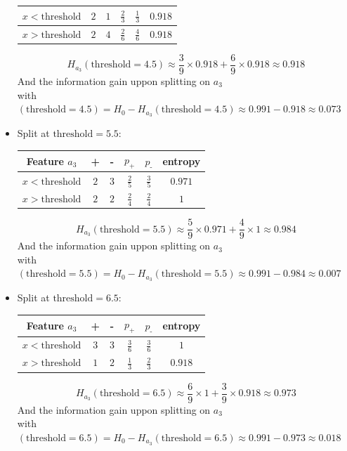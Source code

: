 \documentclass[a4paper, 10pt]{article}
\begin{document}
\begin{itemize}[label=$\square$]
\begin{center}
\begin{tabular}{ |c|c|c|c|c|c| }
            \hline
            $x<\text{threshold}$    & $2$    & $1$   & $\frac{2}{3}$ & $\frac{1}{3}$    & $0.918$\\
            \hline
            $x>\text{threshold}$    & $2$    & $4$   & $\frac{2}{6}$ & $\frac{4}{6} $   & $0.918$\\
            \hline
        \end{tabular}
    \end{center}
    $$
    H_{a_3}(\text{threshold}=4.5) \approx \frac{3}{9}\times0.918 + \frac{6}{9}\times0.918 \approx 0.918
    $$
    And the information gain uppon splitting on $a_3$ \\with $(\text{threshold}=4.5)= H_0 -H_{a_3}(\text{threshold}=4.5) \approx 0.991 - 0.918 \approx 0.073$
    \item Split at $\text{threshold}=5.5$:
    \begin{center}
        \begin{tabular}{ |c|c|c|c|c|c| }
            \hline
            Feature $a_3$           & +      & -     & $p_\text{+}$ & $p_\text{-}$  & entropy\\
            \hline
            $x<\text{threshold}$    & $2$    & $3$   & $\frac{2}{5}$ & $\frac{3}{5}$    & $0.971$\\
            \hline
            $x>\text{threshold}$    & $2$    & $2$   & $\frac{2}{4}$ & $\frac{2}{4} $   & $1$\\
            \hline
        \end{tabular}
    \end{center}
    $$
    H_{a_3}(\text{threshold}=5.5) \approx \frac{5}{9}\times0.971 + \frac{4}{9}\times1 \approx 0.984
    $$
    And the information gain uppon splitting on $a_3$ \\with $(\text{threshold}=5.5)= H_0 -H_{a_3}(\text{threshold}=5.5) \approx 0.991 - 0.984 \approx 0.007$

    \item Split at $\text{threshold}=6.5$:
    \begin{center}
        \begin{tabular}{ |c|c|c|c|c|c| }
            \hline
            Feature $a_3$           & +      & -     & $p_\text{+}$ & $p_\text{-}$  & entropy\\
            \hline
            $x<\text{threshold}$    & $3$    & $3$   & $\frac{3}{6}$ & $\frac{3}{6}$    & $1$\\
            \hline
            $x>\text{threshold}$    & $1$    & $2$   & $\frac{1}{3}$ & $\frac{2}{3} $   & $0.918$\\
            \hline
        \end{tabular}
    \end{center}
    $$
    H_{a_3}(\text{threshold}=6.5) \approx \frac{6}{9}\times1 + \frac{3}{9}\times0.918 \approx 0.973
    $$
    And the information gain uppon splitting on $a_3$ \\with $(\text{threshold}=6.5)= H_0 -H_{a_3}(\text{threshold}=6.5) \approx 0.991 - 0.973 \approx 0.018$


\end{itemize}
\end{document}
